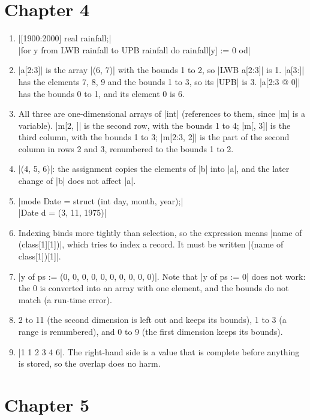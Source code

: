 \section*{Chapter 4}\label{ans-ch4}

\begin{enumerate}
\item \code|[1900:2000] real rainfall;|\\
  \code|for y from LWB rainfall to UPB rainfall do rainfall[y] := 0 od|
\item \code|a[2:3]| is the array \code|(6, 7)| with the bounds 1 to 2, so
  \code|LWB a[2:3]| is 1. \code|a[3:]| has the elements 7, 8, 9 and the
  bounds 1 to 3, so its \code|UPB| is 3. \code|a[2:3 @ 0]| has the bounds
  0 to 1, and its element 0 is 6.
\item All three are one-dimensional arrays of \code|int| (references to
  them, since \code|m| is a variable). \code|m[2, ]| is the second row,
  with the bounds 1 to 4; \code|m[, 3]| is the third column, with the
  bounds 1 to 3; \code|m[2:3, 2]| is the part of the second column in
  rows 2 and 3, renumbered to the bounds 1 to 2.
\item \code|(4, 5, 6)|: the assignment copies the elements of \code|b|
  into \code|a|, and the later change of \code|b| does not affect
  \code|a|.
\item \code|mode Date = struct (int day, month, year);|\\
  \code|Date d = (3, 11, 1975)|
\item Indexing binds more tightly than selection, so the expression means
  \code|name of (class[1][1])|, which tries to index a record. It must be
  written \code|(name of class[1])[1]|.
\item \code|y of ps := (0, 0, 0, 0, 0, 0, 0, 0, 0, 0)|. Note that
  \code|y of ps := 0| does not work: the 0 is converted into an array
  with one element, and the bounds do not match (a run-time error).
\item 2 to 11 (the second dimension is left out and keeps its bounds),
  1 to 3 (a range is renumbered), and 0 to 9 (the first dimension keeps
  its bounds).
\item \code|1 1 2 3 4 6|. The right-hand side is a value that is
  complete before anything is stored, so the overlap does no harm.
\end{enumerate}

\section*{Chapter 5}\label{ans-ch5}

